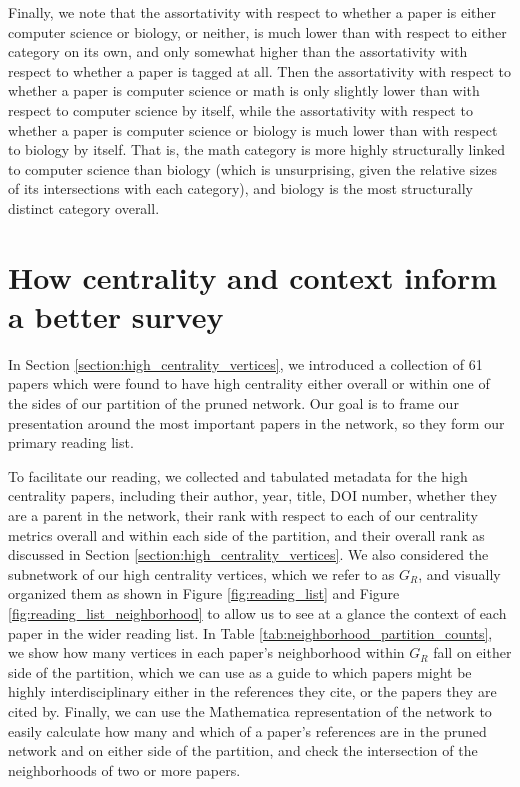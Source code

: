 \documentclass[12pt]{thesis}
\theoremstyle{plain}
\theoremstyle{definition}
\theoremstyle{remark}
\begin{document}
Finally, we note that the assortativity with respect to whether a paper is either computer science or biology, or neither, is much lower than with respect to either category on its own, and only somewhat higher than the assortativity with respect to whether a paper is tagged at all. Then the assortativity with respect to whether a paper is computer science or math is only slightly lower than with respect to computer science by itself, while the assortativity with respect to whether a paper is computer science or biology is much lower than with respect to biology by itself. That is, the math category is more highly structurally linked to computer science than biology (which is unsurprising, given the relative sizes of its intersections with each category), and biology is the most structurally distinct category overall. 

\section{How centrality and context inform a better survey}

In Section \ref{section:high_centrality_vertices}, we introduced a collection of 61 papers which were found to have high centrality either overall or within one of the sides of our partition of the pruned network. Our goal is to frame our presentation around the most important papers in the network, so they form our primary reading list. 

To facilitate our reading, we collected and tabulated metadata for the high centrality papers, including their author, year, title, DOI number, whether they are a parent in the network, their rank with respect to each of our centrality metrics overall and within each side of the partition, and their overall rank as discussed in Section \ref{section:high_centrality_vertices}. We also considered the subnetwork of our high centrality vertices, which we refer to as $G_R$, and visually organized them as shown in Figure \ref{fig:reading_list} and Figure \ref{fig:reading_list_neighborhood} to allow us to see at a glance the context of each paper in the wider reading list. In Table \ref{tab:neighborhood_partition_counts}, we show how many vertices in each paper's neighborhood within $G_R$ fall on either side of the partition, which we can use as a guide to which papers might be highly interdisciplinary either in the references they cite, or the papers they are cited by. Finally, we can use the Mathematica representation of the network to easily calculate how many and which of a paper's references are in the pruned network and on either side of the partition, and check the intersection of the neighborhoods of two or more papers.
\end{document}
